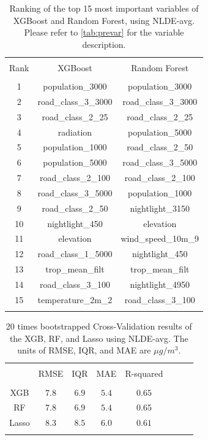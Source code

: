 \documentclass{article}
\begin{document}
\begin{table}[H] \centering 
  \caption{Ranking of the top 15 most important variables of XGBoost and Random Forest, using NLDE-avg. Please refer to  \cref{tab:prevar} for the variable description.} 
    \label{nlde_vimp} 
\begin{tabular}{@{\extracolsep{5pt}} ccc} 
\\[-1.8ex]\hline 
\hline \\[-1.8ex] 
Rank & XGBoost & Random Forest \\ 
\hline \\[-1.8ex] 
1 & population\_3000 & population\_3000 \\ 
2 & road\_class\_3\_3000 & road\_class\_3\_3000 \\ 
3 & road\_class\_2\_25 & road\_class\_2\_25 \\ 
4 & radiation & population\_5000 \\ 
5 & population\_1000 & road\_class\_2\_50 \\ 
6 & population\_5000 & road\_class\_3\_5000 \\ 
7 & road\_class\_2\_100 & road\_class\_2\_100 \\ 
8 & road\_class\_3\_5000 & population\_1000 \\ 
9 & road\_class\_2\_50 & nightlight\_3150 \\ 
10 & nightlight\_450 & elevation \\ 
11 & elevation & wind\_speed\_10m\_9 \\ 
12 & road\_class\_1\_5000 & nightlight\_450 \\ 
13 & trop\_mean\_filt & trop\_mean\_filt \\ 
14 & road\_class\_3\_100 & nightlight\_4950 \\ 
15 & temperature\_2m\_2 & road\_class\_3\_100 \\ 
\hline \\[-1.8ex] 
\end{tabular} 
\end{table} 

\begin{table}[H] \centering 
  \caption{20 times bootstrapped Cross-Validation results of the XGB, RF, and Lasso using NLDE-avg. The units of RMSE, IQR, and MAE are $\mu g/m^3$.} 
    \label{nlde_cv} 
\begin{tabular}{@{\extracolsep{5pt}} cccccccc} 
\\[-1.8ex]\hline 
\hline \\[-1.8ex] 
 
  & RMSE & IQR & MAE & R-squared \\ 
\hline \\[-1.8ex] 
XGB & $7.8$ & $6.9$ & $5.4$ & $0.65$ \\ 
RF & $7.8$ & $6.9$ & $5.4$ & $0.65$ \\ 
Lasso & $8.3$ & $8.5$ & $6.0$ & $0.61$ \\ 
\hline \\[-1.8ex] 
\end{tabular} 
\end{table} 
\end{document}
